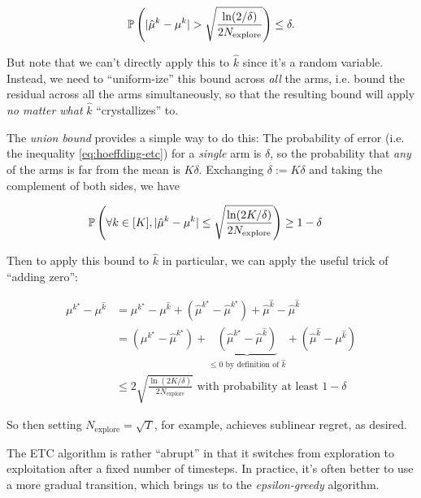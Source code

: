 \documentclass[../main/main]{subfiles}
\begin{document}
\begin{equation}
    \P\left(|\hat \mu^k - \mu^k | > \sqrt{\frac{\ln(2/\delta)}{2N_{\text{explore}}}} \right) \le \delta. \label{eq:hoeffding-etc}
\end{equation}


But note that we can't directly apply this to $\hat k$ since it's a random variable. Instead, we need to ``uniform-ize'' this bound across \emph{all} the arms, i.e. bound the residual across all the arms simultaneously, so that the resulting bound will apply \emph{no matter what} $\hat k$ ``crystallizes'' to.

The \emph{union bound} provides a simple way to do this: The probability of error (i.e. the inequality \ref*{eq:hoeffding-etc}) for a \emph{single} arm is $\delta$, so the probability that \emph{any} of the arms is far from the mean is $K \delta$. Exchanging $\delta := K \delta$ and taking the complement of both sides, we have

\begin{align*}
    \P\left( \forall k \in [K], |\hat \mu^k - \mu^k | \le \sqrt{\frac{\ln(2K/\delta)}{2N_{\text{explore}}}} \right) &\ge 1-\delta
\end{align*}

Then to apply this bound to $\hat k$ in particular, we can apply the useful trick of ``adding zero'':

\begin{align*}
    \mu^{k^\star} - \mu^{\hat k} &= \mu^{k^\star} - \mu^{\hat k} + (\hat \mu^{k^\star} - \hat \mu^{k^\star}) + \hat \mu^{\hat k} - \hat \mu^{\hat k} \\
    &= (\mu^{k^\star} - \hat \mu^{k^\star}) + \underbrace{(\hat \mu^{k^\star} - \hat \mu^{\hat k})}_{\le 0 \text{ by definition of } \hat k} \phantom{} + (\hat \mu^{\hat k} - \mu^{\hat k}) \\
    &\le 2 \sqrt{\frac{\ln(2K/\delta)}{2N_{\text{explore}}}} \text{ with probability at least } 1-\delta
\end{align*}

So then setting $N_{\text{explore}} = \sqrt{T}$, for example, achieves sublinear regret, as desired.


The ETC algorithm is rather ``abrupt'' in that it switches from exploration to exploitation after a fixed number of timesteps. In practice, it's often better to use a more gradual transition, which brings us to the \emph{epsilon-greedy} algorithm.
\end{document}
